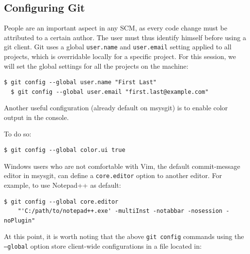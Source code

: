 \documentclass[a4paper]{../../common/tufte-latex/tufte-handout}
\begin{document}
\subsection{Configuring Git}

People are an important aspect in any SCM, as every code change must be attributed to a certain author.
The user must thus identify himself before using a git client.
Git uses a global \texttt{user.name} and \texttt{user.email} setting applied to all projects, which is overridable locally for a specific project.
For this session, we will set the global settings for all the projects on the machine:

\begin{lstlisting}[style=BashInputStyle]
  $ git config --global user.name "First Last"
  $ git config --global user.email "first.last@example.com"
\end{lstlisting}

Another useful configuration (already default on msysgit) is to enable color output in the console.

\noindent To do so:

\begin{lstlisting}[style=BashInputStyle]
  $ git config --global color.ui true
\end{lstlisting}

Windows users who are not comfortable with Vim, the default commit-message editor in msysgit, can define a \texttt{core.editor} option to another editor.
For example, to use Notepad++ as default:

\begin{lstlisting}[style=BashInputStyle]
  $ git config --global core.editor
    "'C:/path/to/notepad++.exe' -multiInst -notabbar -nosession -noPlugin"
\end{lstlisting}

At this point, it is worth noting that the above \texttt{git config} commands using the \texttt{--global} option store client-wide configurations in a file located in:
\end{document}
